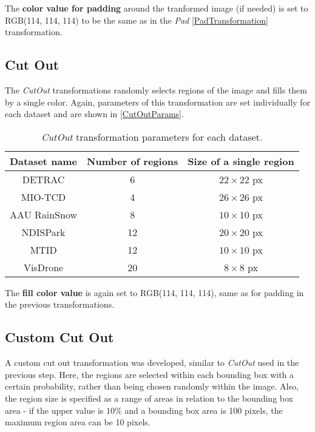 The \textbf{color value for padding} around the tranformed image (if needed)
is set to RGB(114, 114, 114) to be the same as in the \textit{Pad} \ref{PadTransformation} transformation.

\subsection*{Cut Out}

The \textit{CutOut} transformations randomly selects regions of the image and fills them by a single color. Again,
parameters of this transformation are set individually for each dataset and are shown in \autoref{CutOutParams}.

\begin{table}[h]
\centering
\label{CutOutParams}
\begin{tabular}{|c|c|c|}
    \hline
    Dataset name & Number of regions & Size of a single region \\
    \hline
    DETRAC       &  6 & $22 \times 22$ px \\
    MIO-TCD      &  4 & $26 \times 26$ px \\
    AAU RainSnow &  8 & $10 \times 10$ px \\
    NDISPark     & 12 & $20 \times 20$ px \\
    MTID         & 12 & $10 \times 10$ px \\
    VisDrone     & 20 & $8 \times 8$ px \\
    \hline
\end{tabular}
\caption{\textit{CutOut} transformation parameters for each dataset.}
\end{table}

The \textbf{fill color value} is again set to RGB(114, 114, 114), same as for
padding in the previous transformations.

\subsection*{Custom Cut Out}

A custom cut out transformation was developed, similar to \textit{CutOut} used
in the previous step. Here, the regions are selected within each bounding box
with a certain probability, rather than being chosen randomly within the image.
Also, the region size is specified as a range of areas in relation to the
bounding box area - if the upper value is $10\%$ and a bounding box area is 100
pixels, the maximum region area can be 10 pixels.

